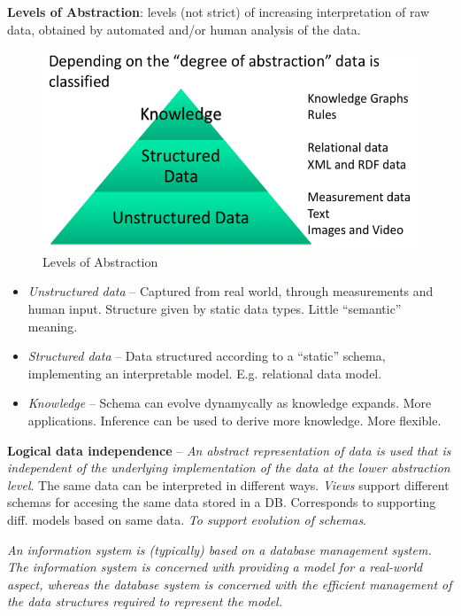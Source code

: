 \textbf{Levels of Abstraction}: levels (not strict) of increasing interpretation of raw data, obtained by automated and/or human analysis of the data.

    \begin{figure}[htp]
      \centering
        \includegraphics[width=.7\textwidth]{images/levabs.png}
        \caption{Levels of Abstraction}
        \label{fig:levabs}
    \end{figure}

\begin{itemize}
	\item \emph{Unstructured data} -- Captured from real world, through measurements and human input. Structure given by static data types. Little ``semantic'' meaning.
	\item \emph{Structured data} -- Data structured according to a ``static'' schema, implementing an interpretable model. E.g. relational data model.
	\item \emph{Knowledge} -- Schema can evolve dynamycally as knowledge expands. More applications. Inference can be used to derive more knowledge. More flexible.
\end{itemize}

\textbf{Logical data independence} -- \emph{An abstract representation
of data is used that is independent of the underlying
implementation of the data at the lower abstraction level}. The same data can be interpreted in different ways. \emph{Views} support different schemas for accesing the same data stored in a DB. Corresponds to supporting diff. models based on same data. \emph{To support evolution of schemas}.

\emph{An information system is (typically) based on a database management system. The information system is concerned with providing a model for a real-world aspect, whereas the database system is concerned with the efficient management of the data structures required to represent the model.}

